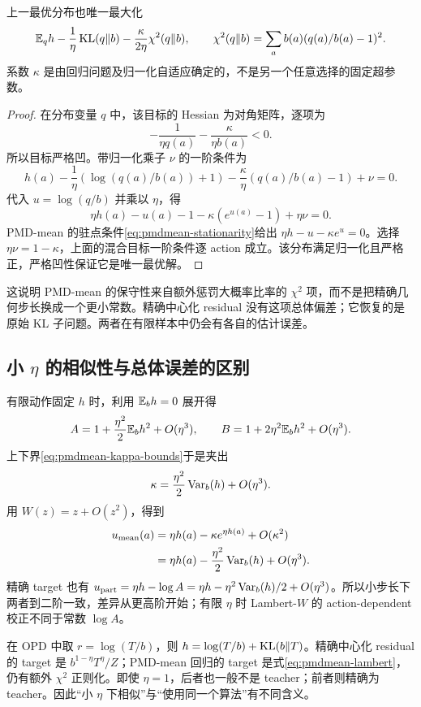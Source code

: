 \begin{proposition}
\label{prop:pmdmean-mixed}
上一最优分布也唯一最大化
\begin{equation}
 \mathbb{E}_qh-\frac1\eta\operatorname{KL}(q\Vert b)
 -\frac{\kappa}{2\eta}\chi^2(q\Vert b),\qquad
 \chi^2(q\Vert b)=\sum_ab(a)(q(a)/b(a)-1)^2.
 \label{eq:pmdmean-mixed-objective}
\end{equation}
系数 $\kappa$ 是由回归问题及归一化自适应确定的，不是另一个任意选择的固定超参数。
\end{proposition}
\begin{proof}
在分布变量 $q$ 中，该目标的 Hessian 为对角矩阵，逐项为
\[
 -\frac1{\eta q(a)}-\frac\kappa{\eta b(a)}<0.
\]
所以目标严格凹。带归一化乘子 $\nu$ 的一阶条件为
\[
 h(a)-\frac1\eta(\log(q(a)/b(a))+1)
 -\frac\kappa\eta(q(a)/b(a)-1)+\nu=0.
\]
代入 $u=\log(q/b)$ 并乘以 $\eta$，得
\[
 \eta h(a)-u(a)-1-\kappa(e^{u(a)}-1)+\eta\nu=0.
\]
PMD-mean 的驻点条件\eqref{eq:pmdmean-stationarity}给出 $\eta h-u-\kappa e^u=0$。选择 $\eta\nu=1-\kappa$，上面的混合目标一阶条件逐 action 成立。该分布满足归一化且严格正，严格凹性保证它是唯一最优解。
\end{proof}

这说明 PMD-mean 的保守性来自额外惩罚大概率比率的 $\chi^2$ 项，而不是把精确几何步长换成一个更小常数。精确中心化 residual 没有这项总体偏差；它恢复的是原始 KL 子问题。两者在有限样本中仍会有各自的估计误差。

\subsection{小 $\eta$ 的相似性与总体误差的区别}

有限动作固定 $h$ 时，利用 $\mathbb{E}_bh=0$ 展开得
\[
 A=1+\frac{\eta^2}{2}\mathbb{E}_bh^2+O(\eta^3),\qquad
 B=1+2\eta^2\mathbb{E}_bh^2+O(\eta^3).
\]
上下界\eqref{eq:pmdmean-kappa-bounds}于是夹出
\[
 \kappa=\frac{\eta^2}{2}\operatorname{Var}_b(h)+O(\eta^3).
\]
用 $W(z)=z+O(z^2)$，得到
\begin{align*}
 u_{\mathrm{mean}}(a)
 &=\eta h(a)-\kappa e^{\eta h(a)}+O(\kappa^2)\\
 &=\eta h(a)-\frac{\eta^2}{2}\operatorname{Var}_b(h)+O(\eta^3).
\end{align*}
精确 target 也有 $u_{\mathrm{part}}=\eta h-\log A=\eta h-\eta^2\operatorname{Var}_b(h)/2+O(\eta^3)$。所以小步长下两者到二阶一致，差异从更高阶开始；有限 $\eta$ 时 Lambert-$W$ 的 action-dependent 校正不同于常数 $\log A$。

在 OPD 中取 $r=\log(T/b)$，则 $h=\log(T/b)+\operatorname{KL}(b\Vert T)$。精确中心化 residual 的 target 是 $b^{1-\eta}T^\eta/Z$；PMD-mean 回归的 target 是式\eqref{eq:pmdmean-lambert}，仍有额外 $\chi^2$ 正则化。即使 $\eta=1$，后者也一般不是 teacher；前者则精确为 teacher。因此“小 $\eta$ 下相似”与“使用同一个算法”有不同含义。

